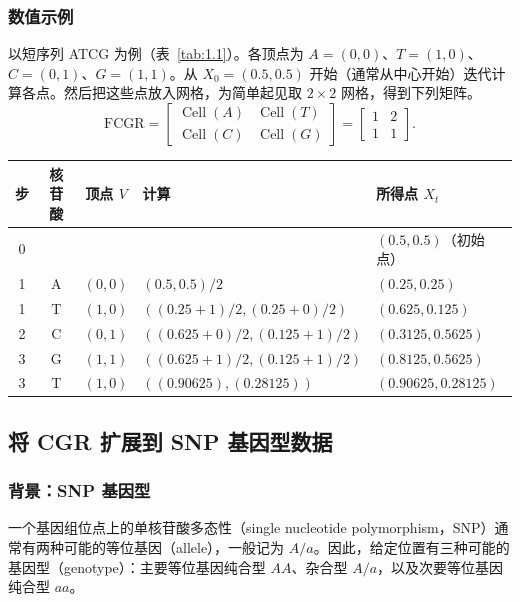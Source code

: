 \subsubsection{数值示例}
以短序列 ATCG 为例（表~\ref{tab:1.1}）。各顶点为 $A=(0,0)$、$T=(1,0)$、$C=(0,1)$、$G=(1,1)$。从 $X_0=(0.5,0.5)$ 开始（通常从中心开始）迭代计算各点。然后把这些点放入网格，为简单起见取 $2\times2$ 网格，得到下列矩阵。
\[
  \mathrm{FCGR}
    =\begin{bmatrix}
        \operatorname{Cell}(A)&\operatorname{Cell}(T)\\
        \operatorname{Cell}(C)&\operatorname{Cell}(G)
      \end{bmatrix}
    =\begin{bmatrix}1&2\\1&1\end{bmatrix}.
\]

\begin{table}[htbp]
  \centering
  \small
  \begin{tabular}{@{}cccll@{}}
    \toprule
    步 & 核苷酸 & 顶点 $V$ & 计算 & 所得点 $X_t$ \\
    \midrule
    0 & & & & $(0.5,0.5)$（初始点） \\
    1 & A & $(0,0)$ & $(0.5,0.5)/2$ & $(0.25,0.25)$ \\
    1 & T & $(1,0)$ & $((0.25+1)/2,(0.25+0)/2)$ & $(0.625,0.125)$ \\
    2 & C & $(0,1)$ & $((0.625+0)/2,(0.125+1)/2)$ & $(0.3125,0.5625)$ \\
    3 & G & $(1,1)$ & $((0.625+1)/2,(0.125+1)/2)$ & $(0.8125,0.5625)$ \\
    3 & T & $(1,0)$ & $((0.90625),(0.28125))$ & $(0.90625,0.28125)$ \\
    \bottomrule
  \end{tabular}
\end{table}

\subsection{将 CGR 扩展到 SNP 基因型数据}
\subsubsection{背景：SNP 基因型}
一个基因组位点上的单核苷酸多态性（single nucleotide polymorphism，SNP）通常有两种可能的等位基因（allele），一般记为 $A/a$。因此，给定位置有三种可能的基因型（genotype）：主要等位基因纯合型 $AA$、杂合型 $A/a$，以及次要等位基因纯合型 $aa$。

